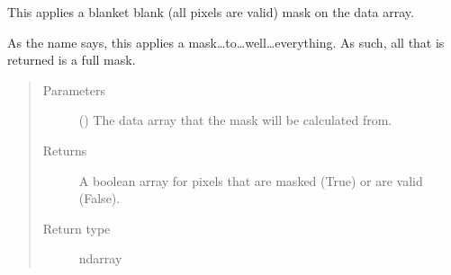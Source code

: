 \documentclass[letterpaper,10pt,english]{sphinxmanual}
\begin{document}

\begin{fulllineitems}
\label{\detokenize{docstrings/ifa_smeargle.masking.geometric:ifa_smeargle.masking.geometric.mask_everything}}
This applies a blanket blank (all pixels are valid) mask on
the data array.

As the name says, this applies a mask…to…well…everything.
As such, all that is returned is a full mask.
\begin{quote}\begin{description}
\item[{Parameters}] \leavevmode
{} () \textendash{} The data array that the mask will be calculated from.

\item[{Returns}] \leavevmode
{} \textendash{} A boolean array for pixels that are masked (True) or are
valid (False).

\item[{Return type}] \leavevmode
ndarray

\end{description}\end{quote}

\end{fulllineitems}

\end{document}

